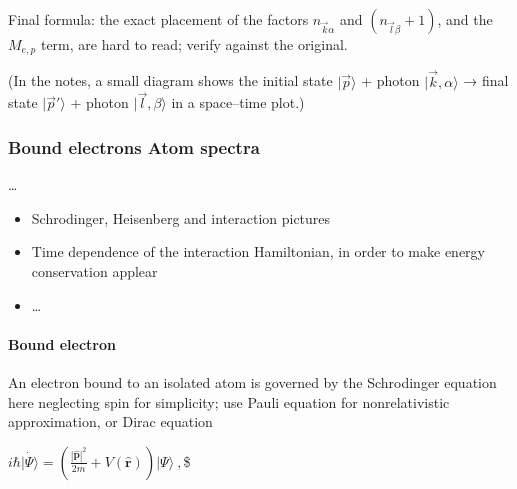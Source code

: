 \documentclass[letterpaper,10pt,english]{jupyterBook}
\begin{document}
\sphinxAtStartPar
\sphinxstylestrong{{[}check{]}} Final formula: the exact placement of the factors \(n_{\vec k\alpha}\) and \((n_{\vec l\beta}+1)\), and the \(M_{e,p}\) term, are hard to read; verify against the original.

\sphinxAtStartPar
(In the notes, a small diagram shows the initial state \(|\vec p\rangle\) + photon \(|\vec k,\alpha\rangle\) → final state \(|\vec p'\rangle\) + photon \(|\vec l,\beta\rangle\) in a space–time plot.)

\sphinxstepscope


\subsubsection{Bound electrons \sphinxhyphen{} Atom spectra}
\label{\detokenize{ch/quantum-mechanics/qft/interactions-e-em-fields-atom-spectrum:bound-electrons-atom-spectra}}\label{\detokenize{ch/quantum-mechanics/qft/interactions-e-em-fields-atom-spectrum:quantum-mechanics-qft-interactions-e-em-fields-atom-spectra}}\label{\detokenize{ch/quantum-mechanics/qft/interactions-e-em-fields-atom-spectrum::doc}}
\sphinxAtStartPar
…

\sphinxAtStartPar
{}
\begin{itemize}
\item {} 
\sphinxAtStartPar
Schrodinger, Heisenberg and interaction pictures

\item {} 
\sphinxAtStartPar
Time dependence of the interaction Hamiltonian, in order to make energy conservation applear

\item {} 
\sphinxAtStartPar
…

\end{itemize}


\paragraph{Bound electron}
\label{\detokenize{ch/quantum-mechanics/qft/interactions-e-em-fields-atom-spectrum:bound-electron}}
\sphinxAtStartPar
An electron bound to an isolated atom is governed by the Schrodinger equation \sphinxhyphen{} here neglecting spin for simplicity; use Pauli equation for non\sphinxhyphen{}relativistic approximation, or Dirac equation \sphinxhyphen{}

\sphinxAtStartPar
\(i \hbar \dot{| \Psi \rangle} = \left( \frac{|\hat{\mathbf{p}}|^2}{2 m} + V(\hat{\mathbf{r}}) \right) | \Psi \rangle \ ,\)\$
\end{document}
